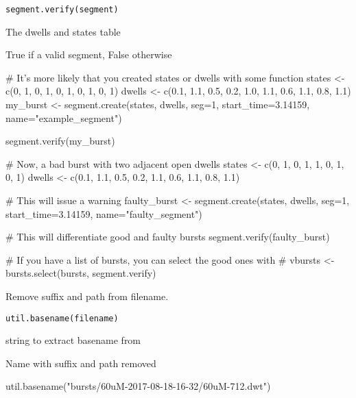 \documentclass[letterpaper]{book}
\begin{document}
%
\begin{Usage}
\begin{verbatim}
segment.verify(segment)
\end{verbatim}
\end{Usage}
%
\begin{Arguments}
\begin{ldescription}
\item[\code{segment}] The dwells and states table
\end{ldescription}
\end{Arguments}
%
\begin{Value}
True if a valid segment, False otherwise
\end{Value}
%
\begin{Examples}
\begin{ExampleCode}

# It's more likely that you created states or dwells with some function
states  <-  c(0,      1,    0,    1,    0,    1,    0,    1,    0,    1)
dwells  <-  c(0.1,  1.1,  0.5,  0.2,  1.0,  1.1,  0.6,  1.1,  0.8,  1.1)
my_burst <- segment.create(states, dwells, seg=1, start_time=3.14159, name="example_segment")

segment.verify(my_burst)

# Now, a bad burst with two adjacent open dwells
states  <-  c(0,      1,    0,    1,    1,    0,    1,    0,    1)
dwells  <-  c(0.1,  1.1,  0.5,  0.2,  1.1,  0.6,  1.1,  0.8,  1.1)

# This will issue a warning
faulty_burst <- segment.create(states, dwells, seg=1, start_time=3.14159, name="faulty_segment")

# This will differentiate good and faulty bursts
segment.verify(faulty_burst)

# If you have a list of bursts, you can select the good ones with
# vbursts <- bursts.select(bursts, segment.verify)

\end{ExampleCode}
\end{Examples}
%
\begin{Description}\relax
Remove suffix and path from filename.
\end{Description}
%
\begin{Usage}
\begin{verbatim}
util.basename(filename)
\end{verbatim}
\end{Usage}
%
\begin{Arguments}
\begin{ldescription}
\item[\code{filename}] string to extract basename from
\end{ldescription}
\end{Arguments}
%
\begin{Value}
Name with suffix and path removed
\end{Value}
%
\begin{Examples}
\begin{ExampleCode}
util.basename("bursts/60uM-2017-08-18-16-32/60uM-712.dwt")
\end{ExampleCode}
\end{Examples}
\printindex{}
\end{document}
